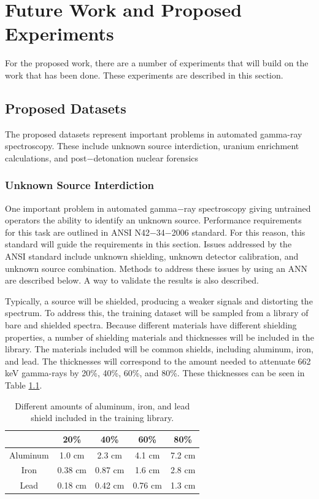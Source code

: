 \documentclass[tocnosub,noragright,centerchapter,12pt,fullpage]{uiucecethesis09}
\begin{document}
\chapter{Future Work and Proposed Experiments}

For the proposed work, there are a number of experiments that will build on the work that has been done. These experiments are described in this section.

\section{Proposed Datasets}

The proposed datasets represent important problems in automated gamma-ray spectroscopy. These include unknown source interdiction, uranium enrichment calculations, and post$-$detonation nuclear forensics 

\subsection{Unknown Source Interdiction} \label{UnknownSourceInterdiction}

One important problem in automated gamma$-$ray spectroscopy giving untrained operators the ability to identify an unknown source. Performance requirements for this task are outlined in ANSI N42$-$34$-$2006 standard. For this reason, this standard will guide the requirements in this section. Issues addressed by the ANSI standard include unknown shielding, unknown detector calibration, and unknown source combination. Methods to address these issues by using an ANN are described below. A way to validate the results is also described. 

Typically, a source will be shielded, producing a weaker signals and distorting the spectrum. To address this, the training dataset will be sampled from a library of bare and shielded spectra. Because different materials have different shielding properties, a number of shielding materials and thicknesses will be included in the library. The materials included will be common shields, including aluminum, iron, and lead. The thicknesses will correspond to the amount needed to attenuate 662 keV gamma-rays by 20\%, 40\%, 60\%, and 80\%. These thicknesses can be seen in Table \ref{table:Shielding_to_include}.

\begin{table}[H]
\centering
\caption{Different amounts of aluminum, iron, and lead shield included in the training library.}
\label{table:Shielding_to_include}
\begin{tabular}{c|c|c|c|c|}
\cline{2-5}
                               & 20\% & 40\% & 60\% & 80\% \\ \hline
\multicolumn{1}{|c|}{Aluminum} & 1.0 cm  & 2.3 cm  & 4.1 cm & 7.2 cm \\ \hline
\multicolumn{1}{|c|}{Iron}     & 0.38 cm  & 0.87 cm  & 1.6 cm & 2.8 cm  \\ \hline
\multicolumn{1}{|c|}{Lead}     & 0.18 cm  & 0.42 cm  & 0.76 cm  & 1.3 cm \\ \hline
\end{tabular}
\end{table}
\end{document}
